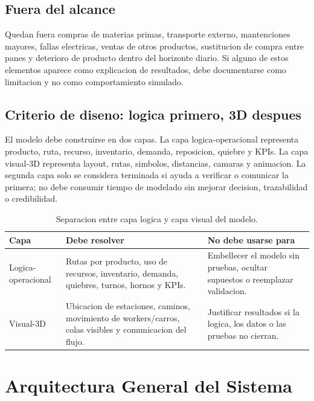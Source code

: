 \documentclass[12pt]{article}
\begin{document}
\subsection{Fuera del alcance}

Quedan fuera compras de materias primas, transporte externo, mantenciones mayores, fallas electricas, ventas de otros productos, sustitucion de compra entre panes y deterioro de producto dentro del horizonte diario. Si alguno de estos elementos aparece como explicacion de resultados, debe documentarse como limitacion y no como comportamiento simulado.

\subsection{Criterio de diseno: logica primero, 3D despues}

El modelo debe construirse en dos capas. La capa logica-operacional representa producto, ruta, recurso, inventario, demanda, reposicion, quiebre y KPIs. La capa visual-3D representa layout, rutas, simbolos, distancias, camaras y animacion. La segunda capa solo se considera terminada si ayuda a verificar o comunicar la primera; no debe consumir tiempo de modelado sin mejorar decision, trazabilidad o credibilidad.

\begin{table}[H]
\centering
\caption{Separacion entre capa logica y capa visual del modelo.}
\begin{tabularx}{\textwidth}{L{3.1cm}Y Y}
\toprule
{}
\color{white}Capa & \color{white}Debe resolver & \color{white}No debe usarse para \\
\midrule
Logica-operacional & Rutas por producto, uso de recursos, inventario, demanda, quiebres, turnos, hornos y KPIs. & Embellecer el modelo sin pruebas, ocultar supuestos o reemplazar validacion. \\
Visual-3D & Ubicacion de estaciones, caminos, movimiento de workers/carros, colas visibles y comunicacion del flujo. & Justificar resultados si la logica, los datos o las pruebas no cierran. \\
\bottomrule
\end{tabularx}
\end{table}

\section{Arquitectura General del Sistema}
\end{document}
